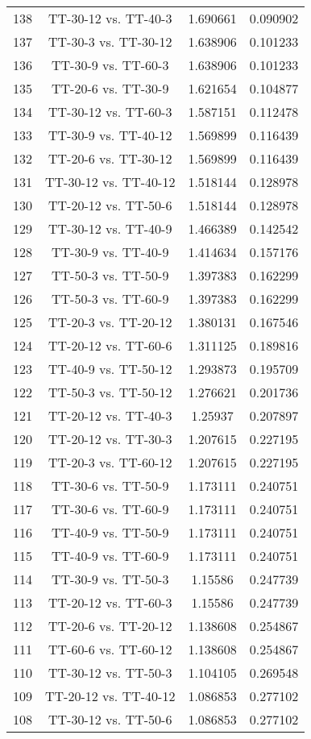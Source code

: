 \documentclass[a4paper,10pt]{article}
\begin{document}
\begin{landscape}
\begin{table}[!htp]
\begin{tabular}{cccc}
138&TT-30-12 vs. TT-40-3&1.690661&0.090902\\
137&TT-30-3 vs. TT-30-12&1.638906&0.101233\\
136&TT-30-9 vs. TT-60-3&1.638906&0.101233\\
135&TT-20-6 vs. TT-30-9&1.621654&0.104877\\
134&TT-30-12 vs. TT-60-3&1.587151&0.112478\\
133&TT-30-9 vs. TT-40-12&1.569899&0.116439\\
132&TT-20-6 vs. TT-30-12&1.569899&0.116439\\
131&TT-30-12 vs. TT-40-12&1.518144&0.128978\\
130&TT-20-12 vs. TT-50-6&1.518144&0.128978\\
129&TT-30-12 vs. TT-40-9&1.466389&0.142542\\
128&TT-30-9 vs. TT-40-9&1.414634&0.157176\\
127&TT-50-3 vs. TT-50-9&1.397383&0.162299\\
126&TT-50-3 vs. TT-60-9&1.397383&0.162299\\
125&TT-20-3 vs. TT-20-12&1.380131&0.167546\\
124&TT-20-12 vs. TT-60-6&1.311125&0.189816\\
123&TT-40-9 vs. TT-50-12&1.293873&0.195709\\
122&TT-50-3 vs. TT-50-12&1.276621&0.201736\\
121&TT-20-12 vs. TT-40-3&1.25937&0.207897\\
120&TT-20-12 vs. TT-30-3&1.207615&0.227195\\
119&TT-20-3 vs. TT-60-12&1.207615&0.227195\\
118&TT-30-6 vs. TT-50-9&1.173111&0.240751\\
117&TT-30-6 vs. TT-60-9&1.173111&0.240751\\
116&TT-40-9 vs. TT-50-9&1.173111&0.240751\\
115&TT-40-9 vs. TT-60-9&1.173111&0.240751\\
114&TT-30-9 vs. TT-50-3&1.15586&0.247739\\
113&TT-20-12 vs. TT-60-3&1.15586&0.247739\\
112&TT-20-6 vs. TT-20-12&1.138608&0.254867\\
111&TT-60-6 vs. TT-60-12&1.138608&0.254867\\
110&TT-30-12 vs. TT-50-3&1.104105&0.269548\\
109&TT-20-12 vs. TT-40-12&1.086853&0.277102\\
108&TT-30-12 vs. TT-50-6&1.086853&0.277102\\

\end{tabular}
\end{table}
\end{landscape}
\end{document}
